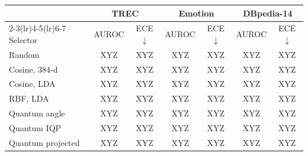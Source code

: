 \begin{tabular}{@{}l cc cc cc@{}}
\toprule
 & \multicolumn{2}{c}{TREC} & \multicolumn{2}{c}{Emotion} & \multicolumn{2}{c}{DBpedia-14} \\
\cmidrule(lr){2-3}\cmidrule(lr){4-5}\cmidrule(lr){6-7}
Selector & AUROC & ECE$\downarrow$ & AUROC & ECE$\downarrow$ & AUROC & ECE$\downarrow$ \\
\midrule
Random & XYZ & XYZ & XYZ & XYZ & XYZ & XYZ \\
Cosine, 384-d & XYZ & XYZ & XYZ & XYZ & XYZ & XYZ \\
Cosine, LDA & XYZ & XYZ & XYZ & XYZ & XYZ & XYZ \\
RBF, LDA & XYZ & XYZ & XYZ & XYZ & XYZ & XYZ \\
Quantum angle & XYZ & XYZ & XYZ & XYZ & XYZ & XYZ \\
Quantum IQP & XYZ & XYZ & XYZ & XYZ & XYZ & XYZ \\
Quantum projected & XYZ & XYZ & XYZ & XYZ & XYZ & XYZ \\
\bottomrule
\end{tabular}
